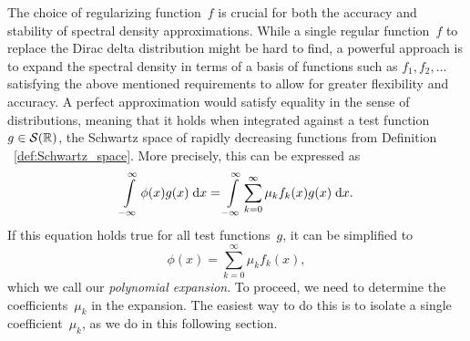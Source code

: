 The choice of regularizing function~$f$ is crucial for both the accuracy and stability of spectral density approximations. While a single regular function~$f$ to replace the Dirac delta distribution might be hard to find, a powerful approach is to expand the spectral density in terms of a basis of functions such as $f_1, f_2, \ldots$ satisfying the above mentioned requirements to allow for greater flexibility and accuracy. A perfect approximation would satisfy equality in the sense of distributions, meaning that it holds when integrated against a test function~$g \in \mathcal{S}(\mathbb{R})$, the Schwartz space of rapidly decreasing functions from Definition ~\ref{def:Schwartz_space}. More precisely, this can be expressed as
\[
\int\limits_{-\infty}^{\infty} \phi(x) g(x) \;\mathrm{d}x = \int\limits_{-\infty}^{\infty} \sum_{k=0}^{\infty} \mu_k f_k(x) g(x) \;\mathrm{d}x.
\]
If this equation holds true for all test functions~$g$, it can be simplified to
\begin{equation} \label{eq:polynomial_expansion}
    \phi(x) = \sum_{k=0}^{\infty} \mu_k f_k(x),
\end{equation}
which we call our \emph{polynomial expansion}. To proceed, we need to determine the coefficients~$\mu_k$ in the expansion. The easiest way to do this is to isolate a single coefficient~$\mu_k$, as we do in this following section.

